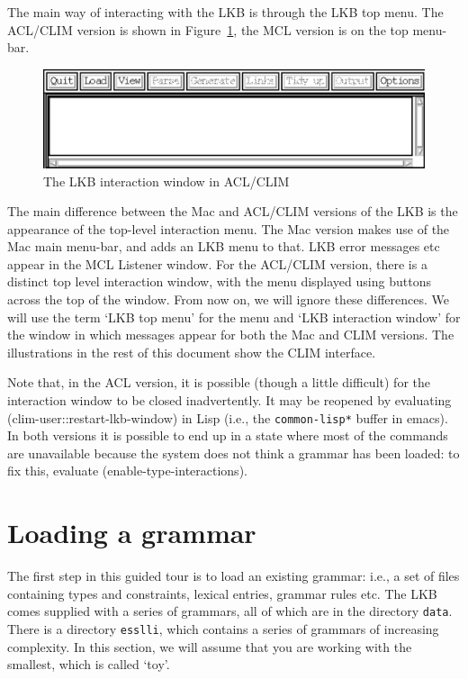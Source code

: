 \documentclass[12pt]{report}
\newcommand{\filename}[1]{{\tt #1}}
\begin{document}
The main way of interacting with the LKB is through the LKB top menu.
The ACL/CLIM version is shown in Figure~\ref{lunix2}, the MCL version
is on the top menu-bar.
\begin{figure}
\includegraphics[width=400bp]{figs/lkbtop-unix}
\caption{The LKB interaction window in ACL/CLIM}
\label{lunix2}
\end{figure}
The main difference between the Mac and ACL/CLIM versions of the
LKB is the appearance of the top-level interaction menu.
The Mac version makes use of the Mac main menu-bar, and adds an LKB
menu to that.  LKB error messages etc appear in the MCL
Listener window.  For the ACL/CLIM version, there is a distinct
top level interaction window, with the menu displayed using
buttons across the top of the window.  From now on,
we will ignore these differences.
We will use the term `LKB top menu' 
for the menu and `LKB interaction window' for the window in which messages 
appear
for both the Mac and CLIM versions.  The illustrations in 
the rest of this
document show the CLIM interface.

Note that, in the ACL version, it is possible (though 
a little difficult) for the interaction
window to be closed inadvertently.
It may be reopened by evaluating
(clim-user::restart-lkb-window) in Lisp (i.e., the
{\tt *common-lisp*} buffer in emacs).
In both versions it is possible to end up in a state 
where most of the commands are unavailable because the system
does not think a grammar has been loaded: to
fix this, evaluate (enable-type-interactions).

\section{Loading a grammar}
\label{gramload}

The first step in this guided tour is to load an existing grammar: i.e.,
a set of files containing types and constraints, 
lexical entries, grammar rules etc.  
The LKB comes supplied with a series of grammars,
all of which are in the directory \filename{data}.  
There is a directory \filename{esslli}, which contains a series
of grammars of increasing complexity.
In this section, we
will assume that you are working with the smallest, which is called
`toy'.  
\end{document}
